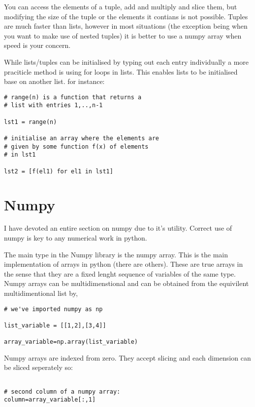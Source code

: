 \documentclass[11pt,a4paper]{article}
\begin{document}
You can access the elements of a tuple, add and multiply and slice them, but modifying the size of the tuple or the elements it contians is not possible. Tuples are much faster than lists, however in most situations (the exception being when you want to make use of nested tuples) it is better to use a numpy array when speed is your concern.


While lists/tuples can be initialised by typing out each entry individually a more praciticle method is using for loops in lists. This enables lists to be initialised base on another list. for instance:

\begin{verbatim}
# range(n) is a function that returns a
# list with entries 1,..,n-1

lst1 = range(n)

# initialise an array where the elements are
# given by some function f(x) of elements
# in lst1

lst2 = [f(el1) for el1 in lst1]

\end{verbatim}

\section{Numpy}

I have devoted an entire section on numpy due to it's utility. Correct use of numpy is key to any numerical work in python.

The main type in the Numpy library is the numpy array. This is the main implementation of arrays in python (there are others). These are true arrays in the sense that they are a fixed lenght sequence of variables of the same type. Numpy arrays can be multidimenstional and can be obtained from the equivilent multidimentional list by,

\begin{verbatim}
# we've imported numpy as np

list_variable = [[1,2],[3,4]]

array_variable=np.array(list_variable)

\end{verbatim}

Numpy arrays are indexed from zero. They accept slicing and each dimension can be sliced seperately so:

\begin{verbatim}

# second column of a numpy array:
column=array_variable[:,1]

\end{verbatim}
\end{document}
